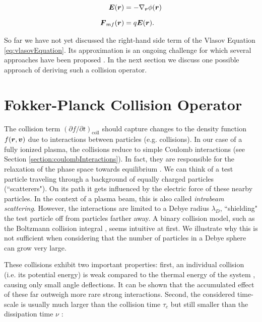 \begin{align}
    \label{eq:efieldPoisson}
    \vect E(\vect r) &= - \posNabla \phi(\vect r) \eqVspace
    \vect F_{mf}(\vect r) &= q \vect E(\vect r).
\end{align}

So far we have not yet discussed the right-hand side term of the Vlasov Equation
\ref{eq:vlasovEquation}. Its approximation is an ongoing challenge for which several approaches have been
proposed \cite{rosenbluth,manheimer1997langevin,cadjan_ivanov_1999}.
In the next section we discuss one possible approach of deriving such a collision operator.

\section{Fokker-Planck Collision Operator}
\label{section:focker_planck}


The collision term $(\partial f / \partial t)_{\text{coll}}$ should capture changes to the density
function $f(\boldsymbol{r}, \boldsymbol{v})$ due to interactions between particles (e.g. collisions). In our case
of a fully ionized plasma, the collisions reduce to simple Coulomb interactions (see Section
\ref{section:coulombInteractions}). In fact, they are
responsible for the relaxation of the phase space towards equilibrium \cite{sorensen1992Intrabeam}.
We can think of a test particle traveling through a background of equally charged particles
(``scatterers"). On its path it
gets influenced by the electric force of these nearby particles. In the context of a plasma beam,
this is also called \emph{intrabeam scattering}.
However, the interactions are limited to a Debye radius $\lambda_D$, ``shielding" the test particle off from particles
farther away.
A binary collision model, such as the Boltzmann collision integral \cite{Callen}, seems intuitive at first.
We illustrate why this is not sufficient when considering that the number of particles in a Debye sphere can
grow very large.

These collisions exhibit two important properties: first, an individual collision (i.e. its potential
energy) is weak compared to the thermal energy of the system \cite{boyd_sanderson_2003}, causing only 
small angle deflections. It can be shown that the accumulated effect of these far 
outweigh more rare strong interactions. Second, the considered time-scale is usually much larger 
than the collision time $\tau_c$ but still smaller than the dissipation time $\nu$ \cite{nicholson1983_appendixB}:

